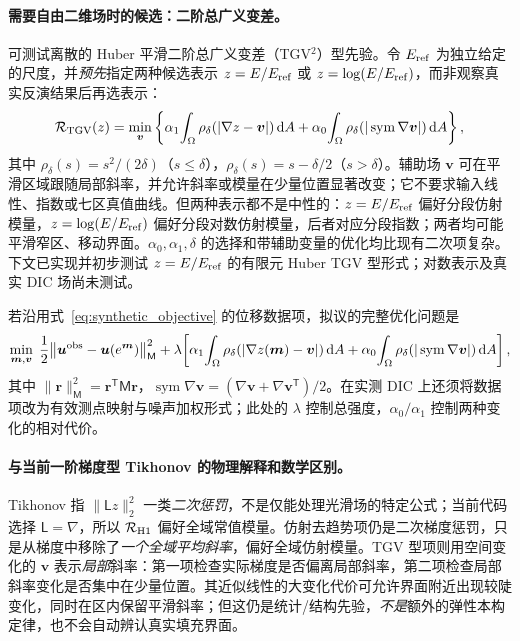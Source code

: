 \documentclass[11pt,a4paper]{ctexart}
\begin{document}
\paragraph{需要自由二维场时的候选：二阶总广义变差。}
可测试离散的 Huber 平滑二阶总广义变差（TGV$^2$）型先验\cite{bredies2010tgv}。令 $E_{\rm ref}$ 为独立给定的尺度，并\emph{预先}指定两种候选表示 $z=E/E_{\rm ref}$ 或 $z=\log(E/E_{\rm ref})$，而非观察真实反演结果后再选表示：
\begin{equation}\label{eq:tgv_candidate}
 \mathcal R_{\rm TGV}(z)=\min_{\boldsymbol v}
 \left\{\alpha_1\!\int_\Omega\rho_\delta(|\nabla z-\boldsymbol v|)\,\mathrm dA
 +\alpha_0\!\int_\Omega\rho_\delta(|\operatorname{sym}\nabla\boldsymbol v|)\,\mathrm dA\right\},
\end{equation}
其中 $\rho_\delta(s)=s^2/(2\delta)$（$s\leq\delta$），$\rho_\delta(s)=s-\delta/2$（$s>\delta$）。辅助场 $\boldsymbol v$ 可在平滑区域跟随局部斜率，并允许斜率或模量在少量位置显著改变；它不要求输入线性、指数或七区真值曲线。但两种表示都不是中性的：$z=E/E_{\rm ref}$ 偏好分段仿射模量，$z=\log(E/E_{\rm ref})$ 偏好分段对数仿射模量，后者对应分段指数；两者均可能平滑窄区、移动界面。$\alpha_0,\alpha_1,\delta$ 的选择和带辅助变量的优化均比现有二次项复杂。下文已实现并初步测试 $z=E/E_{\rm ref}$ 的有限元 Huber TGV 型形式；对数表示及真实 DIC 场尚未测试。

若沿用式~\eqref{eq:synthetic_objective} 的位移数据项，拟议的完整优化问题是
\begin{equation}\label{eq:tgv_objective}
 \min_{\boldsymbol m,\boldsymbol v}\;
 \frac12\bigl\|\boldsymbol u^{\rm obs}-\boldsymbol u(e^{\boldsymbol m})\bigr\|_{\mathsf M}^{2}
 +\lambda\!\left[\alpha_1\!\int_\Omega\rho_\delta(|\nabla z(\boldsymbol m)-\boldsymbol v|)\,\mathrm dA
 +\alpha_0\!\int_\Omega\rho_\delta(|\operatorname{sym}\nabla\boldsymbol v|)\,\mathrm dA\right],
\end{equation}
其中 $\|\boldsymbol r\|_{\mathsf M}^2=\boldsymbol r^{\mathsf T}\mathsf M\boldsymbol r$，$\operatorname{sym}\nabla\boldsymbol v=(\nabla\boldsymbol v+\nabla\boldsymbol v^{\mathsf T})/2$。在实测 DIC 上还须将数据项改为有效测点映射与噪声加权形式；此处的 $\lambda$ 控制总强度，$\alpha_0/\alpha_1$ 控制两种变化的相对代价。

\paragraph{与当前一阶梯度型 Tikhonov 的物理解释和数学区别。}
Tikhonov 指 $\|\mathsf Lz\|_2^2$ 一类\emph{二次惩罚}，不是仅能处理光滑场的特定公式；当前代码选择 $\mathsf L=\nabla$，所以 $\mathcal R_{\rm H1}$ 偏好全域常值模量。仿射去趋势项仍是二次梯度惩罚，只是从梯度中移除了\emph{一个全域平均斜率}，偏好全域仿射模量。TGV 型项则用空间变化的 $\boldsymbol v$ 表示\emph{局部}斜率：第一项检查实际梯度是否偏离局部斜率，第二项检查局部斜率变化是否集中在少量位置。其近似线性的大变化代价可允许界面附近出现较陡变化，同时在区内保留平滑斜率；但这仍是统计/结构先验，\emph{不是}额外的弹性本构定律，也不会自动辨认真实填充界面。
\end{document}
